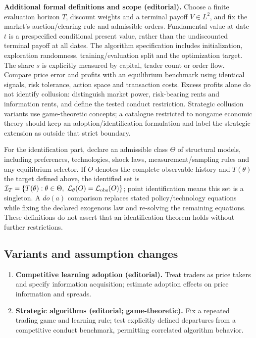 \documentclass[11pt,a4paper]{article}
\begin{document}
\textbf{Additional formal definitions and scope (editorial).} Choose a finite evaluation horizon \(T\), discount weights and a terminal payoff \(V\in L^2\), and fix the market's auction/clearing rule and admissible orders. Fundamental value at date \(t\) is a prespecified conditional present value, rather than the undiscounted terminal payoff at all dates. The algorithm specification includes initialization, exploration randomness, training/evaluation split and the optimization target. The share \(s\) is explicitly measured by capital, trader count or order flow. Compare price error and profits with an equilibrium benchmark using identical signals, risk tolerance, action space and transaction costs. Excess profits alone do not identify collusion: distinguish market power, risk-bearing rents and information rents, and define the tested conduct restriction. Strategic collusion variants use game-theoretic concepts; a catalogue restricted to nongame economic theory should keep an adoption/identification formulation and label the strategic extension as outside that strict boundary.

For the identification part, declare an admissible class \(\Theta\) of structural models, including preferences, technologies, shock laws, measurement/sampling rules and any equilibrium selector. If \(O\) denotes the complete observable history and \(T(\theta)\) the target defined above, the identified set is \(\mathcal I_T=\{T(\theta):\theta\in\Theta,\ \mathcal L_\theta(O)=\mathcal L_{\rm obs}(O)\}\); point identification means this set is a singleton. A \(do(a)\) comparison replaces stated policy/technology equations while fixing the declared exogenous law and re-solving the remaining equations. These definitions do not assert that an identification theorem holds without further restrictions.
\subsection*{Variants and assumption changes}
\begin{enumerate}
\item \textbf{Competitive learning adoption (editorial).} Treat traders as price takers and specify information acquisition; estimate adoption effects on price information and spreads.
\item \textbf{Strategic algorithms (editorial; game-theoretic).} Fix a repeated trading game and learning rule; test explicitly defined departures from a competitive conduct benchmark, permitting correlated algorithm behavior.
\end{enumerate}
\end{document}
